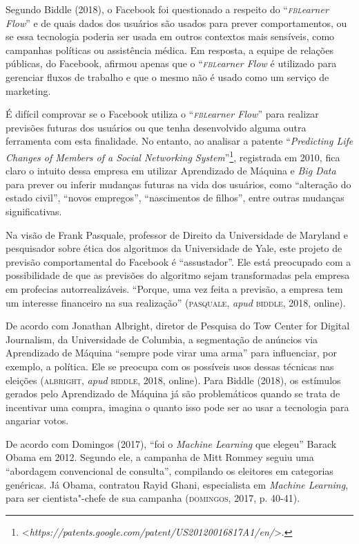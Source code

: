 Segundo Biddle (2018), o Facebook foi questionado a respeito do
``\emph{\textsc{fbl}earner Flow}'' e de quais dados dos usuários são usados para
prever comportamentos, ou se essa tecnologia poderia ser usada em outros
contextos mais sensíveis, como campanhas políticas ou assistência
médica. Em resposta, a equipe de relações públicas, do Facebook, afirmou
apenas que o ``\emph{\textsc{fbl}earner Flow} é utilizado para gerenciar fluxos
de trabalho e que o mesmo não é usado como um serviço de marketing.

É difícil comprovar se o Facebook utiliza o ``\emph{\textsc{fbl}earner Flow}''
para realizar previsões futuras dos usuários ou que tenha desenvolvido
alguma outra ferramenta com esta finalidade. No entanto, ao analisar a
patente ``\emph{Predicting Life Changes of Members of a Social
Networking System}''\footnote{\textless{}\emph{https://patents.google.com/patent/US20120016817A1/en/}\textgreater{}.},
registrada em 2010, fica claro o intuito dessa empresa em utilizar
Aprendizado de Máquina e \emph{Big Data} para prever ou inferir mudanças
futuras na vida dos usuários, como ``alteração do estado civil'',
``novos empregos'', ``nascimentos de filhos'', entre outras mudanças
significativas.

Na visão de Frank Pasquale, professor de Direito da Universidade de
Maryland e pesquisador sobre ética dos algoritmos da Universidade de
Yale, este projeto de previsão comportamental do Facebook é
``assustador''. Ele está preocupado com a possibilidade de que as
previsões do algoritmo sejam transformadas pela empresa em profecias
autorrealizáveis. ``Porque, uma vez feita a previsão, a empresa tem um
interesse financeiro na sua realização'' (\textsc{pasquale}, \emph{apud} \textsc{biddle}, 2018,
online).

De acordo com Jonathan Albright, diretor de Pesquisa do Tow Center for
Digital Journalism, da Universidade de Columbia, a segmentação de
anúncios via Aprendizado de Máquina ``sempre pode virar uma arma'' para
influenciar, por exemplo, a política. Ele se preocupa com os possíveis
usos dessas técnicas nas eleições (\textsc{albright}, \emph{apud} \textsc{biddle}, 2018, online).
Para Biddle (2018), os estímulos gerados pelo Aprendizado de Máquina já
são problemáticos quando se trata de incentivar uma compra, imagina o
quanto isso pode ser ao usar a tecnologia para angariar votos.

De acordo com Domingos (2017), ``foi o \emph{Machine Learning} que
elegeu'' Barack Obama em 2012. Segundo ele, a campanha de Mitt Rommey
seguiu uma ``abordagem convencional de consulta'', compilando os
eleitores em categorias genéricas. Já Obama, contratou Rayid Ghani,
especialista em \emph{Machine Learning}, para ser cientista"-chefe de sua
campanha (\textsc{domingos}, 2017, p. 40-41).

